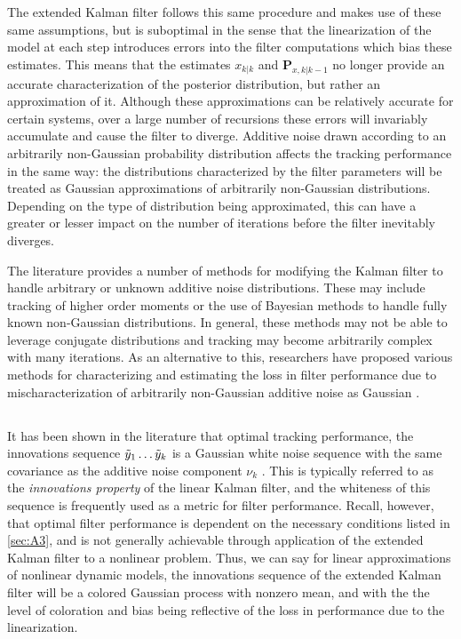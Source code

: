 The extended Kalman filter follows this same procedure and makes use of these same assumptions, but is suboptimal in the sense that the linearization of the model at each step introduces errors into the filter computations which bias these estimates. This means that the estimates  $x_{k|k}$ and $\mathbf{P}_{x,k|k-1}$ no longer provide an accurate characterization of the posterior distribution, but rather an approximation of it. Although these approximations can be relatively accurate for certain systems, over a large number of recursions these errors will invariably accumulate and cause the filter to diverge. Additive noise drawn according to an arbitrarily non-Gaussian probability distribution affects the tracking performance in the same way: the distributions characterized by the filter parameters will be treated as Gaussian approximations of arbitrarily non-Gaussian distributions. Depending on the type of distribution being approximated, this can have a greater or lesser impact on the number of iterations before the filter inevitably diverges.

The literature provides a number of methods for modifying the Kalman filter to handle arbitrary or unknown additive noise distributions. These may include tracking of higher order moments or the use of Bayesian methods to handle fully known non-Gaussian distributions. In general, these methods may not be able to leverage conjugate distributions and tracking may become arbitrarily complex with many iterations. As an alternative to this, researchers have proposed  various methods for characterizing and estimating the loss in filter performance due to mischaracterization of arbitrarily non-Gaussian additive noise as Gaussian \cite{Maryak97}.



\subsection{}

It has been shown in the literature that optimal tracking performance, the innovations sequence $\Tilde{y}_{1} \hdots \Tilde{y}_{k}$ is a Gaussian white noise sequence with the same covariance as the additive noise component $\nu_{k}$ \cite{Frost71}. This is typically referred to as the \emph{innovations property} of the linear Kalman filter, and the whiteness of this sequence is frequently used as a metric for filter performance. Recall, however, that optimal filter performance is dependent on the necessary conditions listed in \ref{sec:A3}, and is not generally achievable through application of the extended Kalman filter to a nonlinear problem. Thus, we can say for linear approximations of nonlinear dynamic models, the innovations sequence of the extended Kalman filter will be a colored Gaussian process with nonzero mean, and with the the level of coloration and bias being reflective of the loss in performance due to the linearization.

